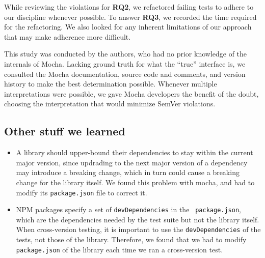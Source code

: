 While reviewing the violations for {\bf RQ2}, we refactored failing
tests to adhere to our discipline whenever possible. To answer {\bf
  RQ3}, we recorded the time required for the refactoring. We also
looked for any inherent limitations of our approach that may make
adherence more difficult.

This study was conducted by the authors, who had no prior knowledge of
the internals of Mocha. Lacking ground truth for what the ``true''
interface is, we consulted the Mocha documentation, source code and
comments, and version history to make the best determination
possible. Whenever multiple interpretations were possible, we gave
Mocha developers the benefit of the doubt, choosing the interpretation
that would minimize SemVer violations.

\subsection{Other stuff we learned}
\begin{itemize}
\item A library should upper-bound their dependencies to stay within
  the current major version, since updrading to the next major version
  of a dependency may introduce a breaking change, which in turn could
  cause a breaking change for the library itself. We found this
  problem with mocha, and had to modify its {\tt package.json} file to
  correct it.
\item NPM packages specify a set of {\tt devDependencies} in the {\tt
    package.json}, which are the dependencies needed by the test suite
  but not the library itself. When cross-version testing, it is
  important to use the {\tt devDependencies} of the tests, not those
  of the library. Therefore, we found that we had to modify {\tt
    package.json} of the library each time we ran a cross-version
  test.
\end{itemize}
